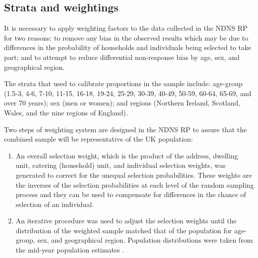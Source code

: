 \subsection{Strata and weightings}\vspace{-0.3cm}

It is necessary to apply weighting factors to the data collected in the NDNS RP for two reasons: to remove any bias in the observed results which may be due to differences in the probability of households and individuals being selected to take part; and to attempt to reduce differential non-response bias by age, sex, and geographical region. 

The strata that used to calibrate proportions in the sample include: age-group (1.5-3, 4-6, 7-10, 11-15, 16-18, 19-24, 25-29, 30-39, 40-49, 50-59, 60-64, 65-69, and over 70 years); sex (men or women); and regions (Northern Ireland, Scotland, Wales, and the nine regions of England). 

Two steps of weighting system are designed in the NDNS RP to assure that the combined sample will be representative of the UK population: 

\begin{enumerate}
	\item An overall selection weight, which is the product of the address, dwelling unit, catering (household) unit, and individual selection weights, was generated to correct for the unequal selection probabilities. These weights are the inverses of the selection probabilities at each level of the random sampling process and they can be used to compensate for differences in the chance of selection of an individual.
	\item An iterative procedure was used to adjust the selection weights until the distribution of the weighted sample matched that of the population for age-group, sex, and geographical region. Population distributions were taken from the mid-year population estimates \parencite{OfficeofNationalStat}. 
\end{enumerate}


